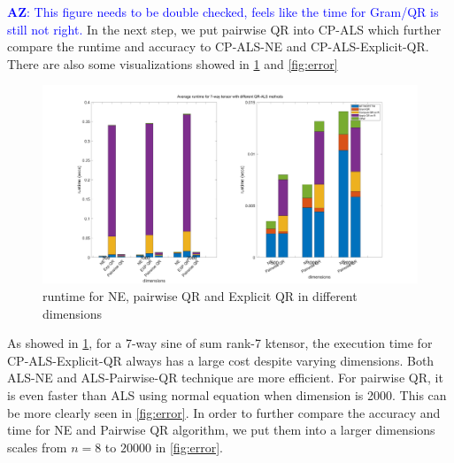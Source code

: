 \documentclass{article}
\newcommand{\AZ}[1]{\textcolor{blue}{\textbf{AZ}: #1}}
\begin{document}
\AZ{This figure needs to be double checked, feels like the time for Gram/QR is still not right.}
In the next step, we put pairwise QR into CP-ALS which further compare the runtime and accuracy to CP-ALS-NE and CP-ALS-Explicit-QR. 
There are also some visualizations showed in \cref{fig:runtime} and \cref{fig:error}
\begin{figure}[ht!]
  \begin{center}
    
    \includegraphics[scale = 0.15]{7runtime.jpg}
    \caption[Figure]{runtime for NE, pairwise QR and Explicit QR in different dimensions \label{fig:runtime}}
  \end{center}
\end{figure}




As showed in \cref*{fig:runtime}, for a 7-way sine of sum rank-7 ktensor, the execution time for CP-ALS-Explicit-QR always has a large cost despite varying dimensions. 
Both ALS-NE and ALS-Pairwise-QR technique are more efficient.
For pairwise QR, it is even faster than ALS using normal equation when dimension is 2000. This can be more clearly seen in \cref{fig:error}.
In order to further compare the accuracy and time for NE and Pairwise QR algorithm, we put them into a larger dimensions scales from $n = 8$ to $20000$ in \cref{fig:error}.
\end{document}
